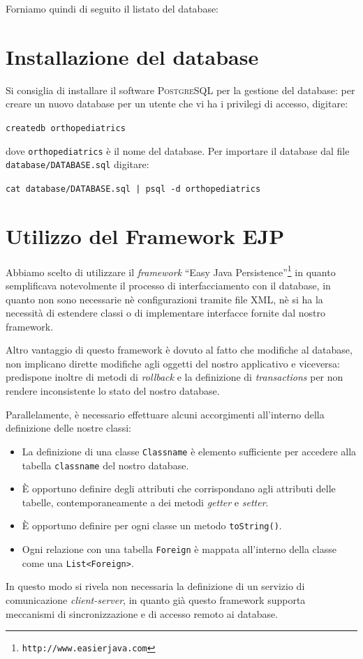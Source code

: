 Forniamo quindi di seguito il listato del database:



\section{Installazione del database}
Si consiglia di installare il software \textsc{PostgreSQL} per la gestione del
database: per creare un nuovo database per un utente che vi ha i privilegi di
accesso, digitare:
\begin{center}
\texttt{createdb orthopediatrics}
\end{center}


dove \texttt{orthopediatrics} è il nome del database. Per importare il database
dal file \texttt{database/DATABASE.sql} digitare:
\begin{center}
\texttt{cat database/DATABASE.sql | psql -d orthopediatrics}
\end{center}

\section{Utilizzo del Framework EJP}\label{sec:dbutilizzejp} 
Abbiamo scelto di utilizzare il \textit{framework} ``Easy Java Persistence''\footnote{
\texttt{http://www.easierjava.com}} in quanto semplificava notevolmente il processo
di interfacciamento con il database, in quanto non sono necessarie nè configurazioni
tramite file XML, nè si ha la necessità di estendere classi o di implementare
interfacce fornite dal nostro framework.  

Altro vantaggio di questo framework è dovuto al fatto che modifiche al database,
non implicano dirette modifiche agli oggetti del nostro applicativo e viceversa:
predispone inoltre di metodi di \textit{rollback} e la definizione di \textit{transactions}
per non rendere inconsistente lo stato del nostro database.

Parallelamente, è necessario effettuare alcuni accorgimenti all'interno della
definizione delle nostre classi:
\begin{itemize}
\item La definizione di una classe \texttt{Classname} è elemento sufficiente per
	accedere alla tabella \texttt{classname} del nostro database.
\item È opportuno definire degli attributi che corrispondano agli attributi delle
	tabelle, contemporaneamente a dei metodi \textit{getter} e \textit{setter}.
\item È opportuno definire per ogni classe un metodo \texttt{toString()}.
\item Ogni relazione con una tabella \texttt{Foreign} è mappata all'interno della
	classe come una \texttt{List<Foreign>}.
\end{itemize}

In questo modo si rivela non necessaria la definizione di un servizio di 
comunicazione \textit{client-server}, in quanto già questo framework supporta
meccanismi di sincronizzazione e di accesso remoto ai database.
